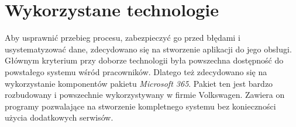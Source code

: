 \section{Wykorzystane technologie}
Aby usprawnić przebieg procesu, zabezpieczyć go przed błędami i usystematyzować dane, zdecydowano się na stworzenie aplikacji do jego obsługi. Głównym kryterium przy doborze technologii była powszechna dostępność do powstałego systemu wśród pracowników. Dlatego też zdecydowano się na wykorzystanie komponentów pakietu \emph{Microsoft 365}. Pakiet ten jest bardzo rozbudowany i powszechnie wykorzystywany w firmie Volkswagen. Zawiera on programy pozwalające na stworzenie kompletnego systemu bez konieczności użycia dodatkowych serwisów.

